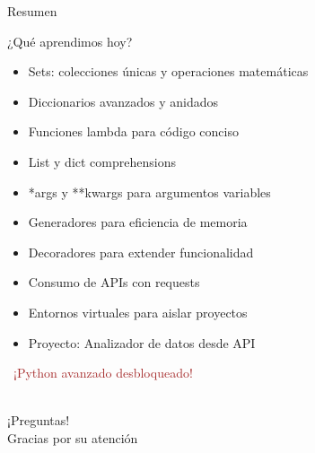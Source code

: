 \documentclass{beamer}
\begin{document}
\begin{frame}{Resumen \faListUl}
\begin{conceptbox}{¿Qué aprendimos hoy?}
\small
\begin{itemize}
    \item[\faCheck] Sets: colecciones únicas y operaciones matemáticas
    \item[\faCheck] Diccionarios avanzados y anidados
    \item[\faCheck] Funciones lambda para código conciso
    \item[\faCheck] List y dict comprehensions
    \item[\faCheck] *args y **kwargs para argumentos variables
    \item[\faCheck] Generadores para eficiencia de memoria
    \item[\faCheck] Decoradores para extender funcionalidad
    \item[\faCheck] Consumo de APIs con requests
    \item[\faCheck] Entornos virtuales para aislar proyectos
    \item[\faCheck] Proyecto: Analizador de datos desde API
\end{itemize}
\end{conceptbox}

\vspace{0.3cm}
\begin{center}
\large\textcolor{brown}{\faRocket\ ¡Python avanzado desbloqueado!}
\end{center}
\end{frame}

\begin{frame}
\begin{center}
\Huge\textcolor{brown}{\faQuestionCircle}\\
\vspace{0.5cm}
\Huge ¡Preguntas!\\
\vspace{1cm}
\Large\textcolor{brownbright}{Gracias por su atención}
\end{center}
\end{frame}
\end{document}
